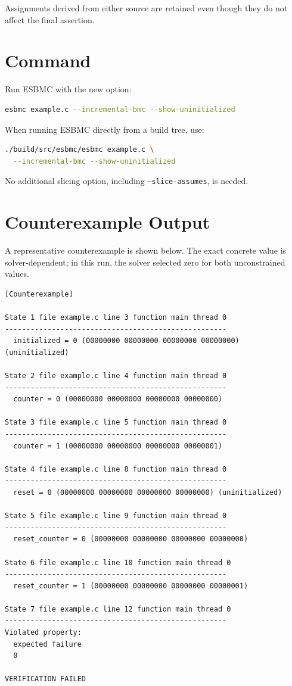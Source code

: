 \documentclass[11pt]{article}
\begin{document}
Assignments derived from either source are retained even though they do not
affect the final assertion.

\section{Command}

Run ESBMC with the new option:

\begin{lstlisting}[language=bash]
esbmc example.c --incremental-bmc --show-uninitialized
\end{lstlisting}

When running ESBMC directly from a build tree, use:

\begin{lstlisting}[language=bash]
./build/src/esbmc/esbmc example.c \
  --incremental-bmc --show-uninitialized
\end{lstlisting}

No additional slicing option, including \texttt{--slice-assumes}, is needed.

\section{Counterexample Output}

A representative counterexample is shown below.  The exact concrete value is
solver-dependent; in this run, the solver selected zero for both unconstrained
values.

\begin{lstlisting}
[Counterexample]

State 1 file example.c line 3 function main thread 0
----------------------------------------------------
  initialized = 0 (00000000 00000000 00000000 00000000) (uninitialized)

State 2 file example.c line 4 function main thread 0
----------------------------------------------------
  counter = 0 (00000000 00000000 00000000 00000000)

State 3 file example.c line 5 function main thread 0
----------------------------------------------------
  counter = 1 (00000000 00000000 00000000 00000001)

State 4 file example.c line 8 function main thread 0
----------------------------------------------------
  reset = 0 (00000000 00000000 00000000 00000000) (uninitialized)

State 5 file example.c line 9 function main thread 0
----------------------------------------------------
  reset_counter = 0 (00000000 00000000 00000000 00000000)

State 6 file example.c line 10 function main thread 0
----------------------------------------------------
  reset_counter = 1 (00000000 00000000 00000000 00000001)

State 7 file example.c line 12 function main thread 0
----------------------------------------------------
Violated property:
  expected failure
  0

VERIFICATION FAILED
\end{lstlisting}
\end{document}
